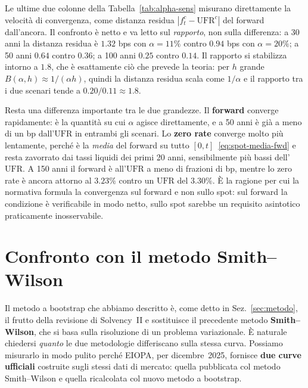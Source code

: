 \documentclass[11pt,a4paper]{article}
\theoremstyle{plain}
\theoremstyle{definition}
\theoremstyle{remark}
\newcommand{\UFR}{\mathrm{UFR}}
\begin{document}


Le ultime due colonne della Tabella~\ref{tab:alpha-sens} misurano direttamente la velocit\`a di
convergenza, come distanza residua $|f^c_t - \UFR^c|$ del forward dall'ancora. Il confronto \`e
netto e va letto sul \emph{rapporto}, non sulla differenza: a 30 anni la distanza residua \`e
$1.32$ bps con $\alpha=11\%$ contro $0.94$ bps con $\alpha=20\%$; a 50 anni $0.64$ contro
$0.36$; a 100 anni $0.25$ contro $0.14$. Il rapporto si stabilizza intorno a $1.8$, che \`e
esattamente ci\`o che prevede la teoria: per $h$ grande $B(\alpha,h)\approx1/(\alpha h)$,
quindi la distanza residua scala come $1/\alpha$ e il rapporto tra i due scenari tende a
$0.20/0.11\approx1.8$.

Resta una differenza importante tra le due grandezze. Il \textbf{forward} converge
rapidamente: \`e la quantit\`a su cui $\alpha$ agisce direttamente, e a 50 anni \`e gi\`a a meno
di un bp dall'$\UFR$ in entrambi gli scenari. Lo \textbf{zero rate} converge molto pi\`u
lentamente, perch\'e \`e la \emph{media} del forward su tutto $[0,t]$~\eqref{eq:spot-media-fwd}
e resta zavorrato dai tassi liquidi dei primi 20 anni, sensibilmente pi\`u bassi dell'$\UFR$.
A 150 anni il forward \`e all'$\UFR$ a meno di frazioni di bp, mentre lo zero rate \`e ancora
attorno al $3.23\%$ contro un $\UFR$ del $3.30\%$. \`E la ragione per cui la normativa formula
la convergenza sul forward e non sullo spot: sul forward la condizione \`e verificabile
in modo netto, sullo spot sarebbe un requisito asintotico praticamente inosservabile.

\section{Confronto con il metodo Smith--Wilson}
\label{sec:confronto-sw}

Il metodo a bootstrap che abbiamo descritto \`e, come detto in Sez.~\ref{sec:metodo}, il frutto
della revisione di Solvency~II e sostituisce il precedente metodo \textbf{Smith--Wilson}, che
si basa sulla risoluzione di un problema variazionale. \`E naturale chiedersi \emph{quanto} le
due metodologie differiscano sulla stessa curva. Possiamo misurarlo in modo pulito perch\'e
EIOPA, per dicembre~2025, fornisce
\textbf{due curve ufficiali} costruite sugli stessi dati di mercato: quella pubblicata col
metodo Smith--Wilson e quella ricalcolata col nuovo metodo a bootstrap.
\end{document}
